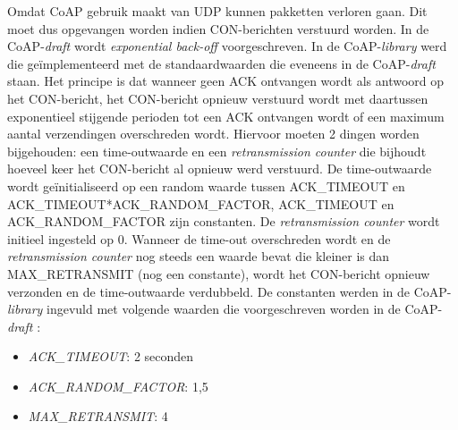 Omdat CoAP gebruik maakt van UDP kunnen pakketten verloren gaan. Dit moet dus opgevangen worden indien CON-berichten verstuurd worden. In de CoAP-\textit{draft} \cite{coapDraft} wordt \textit{exponential back-off} voorgeschreven. In de CoAP-\textit{library} werd die ge\"{i}mplementeerd met de standaardwaarden die eveneens in de CoAP-\textit{draft} \cite{coapDraft} staan. Het principe is dat wanneer geen ACK ontvangen wordt als antwoord op het CON-bericht, het CON-bericht opnieuw verstuurd wordt met daartussen exponentieel stijgende perioden tot een ACK ontvangen wordt of een maximum aantal verzendingen overschreden wordt. Hiervoor moeten 2 dingen worden bijgehouden: een time-outwaarde en een \textit{retransmission counter} die bijhoudt hoeveel keer het CON-bericht al opnieuw werd verstuurd. De time-outwaarde wordt ge\"{i}nitialiseerd op een random waarde tussen ACK\_TIMEOUT en ACK\_TIMEOUT*ACK\_RANDOM\_FACTOR, ACK\_TIMEOUT en ACK\_RANDOM\_FACTOR zijn constanten. De \textit{retransmission counter} wordt initieel ingesteld op 0. Wanneer de time-out overschreden wordt en de \textit{retransmission counter} nog steeds een waarde bevat die kleiner is dan MAX\_RETRANSMIT (nog een constante), wordt het CON-bericht opnieuw verzonden en de time-outwaarde verdubbeld. De constanten werden in de CoAP-\textit{library} ingevuld met volgende waarden die voorgeschreven worden in de CoAP-\textit{draft}  \cite{coapDraft}:
\begin{itemize}
\item \textit{ACK\_TIMEOUT}: 2 seconden
\item \textit{ACK\_RANDOM\_FACTOR}: 1,5
\item \textit{MAX\_RETRANSMIT}: 4
\end{itemize}